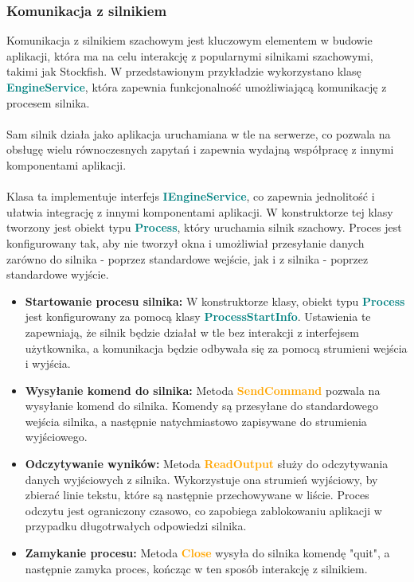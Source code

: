 \documentclass[12pt,a4paper]{article}
\begin{document}
\newpage

\subsubsection{Komunikacja z silnikiem}
Komunikacja z silnikiem szachowym jest kluczowym elementem w budowie aplikacji, która ma na celu interakcję z popularnymi silnikami szachowymi, takimi jak Stockfish. W przedstawionym przykładzie wykorzystano klasę \textcolor{teal}{\textbf{EngineService}}, która zapewnia funkcjonalność umożliwiającą komunikację z procesem silnika.
\\\\
Sam silnik działa jako aplikacja uruchamiana w tle na serwerze, co pozwala na obsługę wielu równoczesnych zapytań i zapewnia wydajną współpracę z innymi komponentami aplikacji.
\\\\
Klasa ta implementuje interfejs \textcolor{teal}{\textbf{IEngineService}}, co zapewnia jednolitość i ułatwia integrację z innymi komponentami aplikacji. W konstruktorze tej klasy tworzony jest obiekt typu \textcolor{teal}{\textbf{Process}}, który uruchamia silnik szachowy. Proces jest konfigurowany tak, aby nie tworzył okna i umożliwiał przesyłanie danych zarówno do silnika - poprzez standardowe wejście, jak i z silnika - poprzez standardowe wyjście.

\begin{itemize} 
    \item \textbf{Startowanie procesu silnika:} W konstruktorze klasy, obiekt typu \textcolor{teal}{\textbf{Process}} jest konfigurowany za pomocą klasy \textcolor{teal}{\textbf{ProcessStartInfo}}. Ustawienia te zapewniają, że silnik będzie działał w tle bez interakcji z interfejsem użytkownika, a komunikacja będzie odbywała się za pomocą strumieni wejścia i wyjścia. 
    \item \textbf{Wysyłanie komend do silnika:} Metoda \textcolor{orange}{\textbf{SendCommand}} pozwala na wysyłanie komend do silnika. Komendy są przesyłane do standardowego wejścia silnika, a następnie natychmiastowo zapisywane do strumienia wyjściowego. 
    \item \textbf{Odczytywanie wyników:} Metoda \textcolor{orange}{\textbf{ReadOutput}} służy do odczytywania danych wyjściowych z silnika. Wykorzystuje ona strumień wyjściowy, by zbierać linie tekstu, które są następnie przechowywane w liście. Proces odczytu jest ograniczony czasowo, co zapobiega zablokowaniu aplikacji w przypadku długotrwałych odpowiedzi silnika. 
    \item \textbf{Zamykanie procesu:} Metoda \textcolor{orange}{\textbf{Close}} wysyła do silnika komendę "quit", a następnie zamyka proces, kończąc w ten sposób interakcję z silnikiem. 
\end{itemize}
\end{document}
